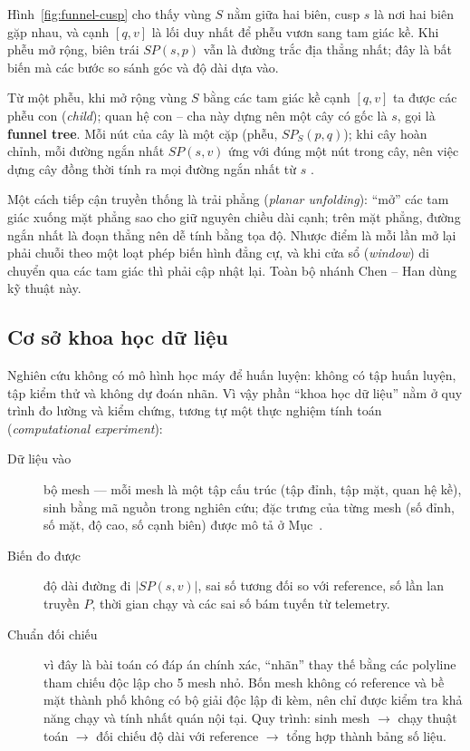 Hình~\ref{fig:funnel-cusp} cho thấy vùng $S$ nằm giữa hai biên, cusp $s$ là nơi
hai biên gặp nhau, và cạnh $[q,v]$ là lối duy nhất để phễu vươn sang tam giác kề.
Khi phễu mở rộng, biên trái $SP(s,p)$ vẫn là đường trắc địa thẳng nhất; đây là
bất biến mà các bước so sánh góc và độ dài dựa vào.

Từ một phễu, khi mở rộng vùng $S$ bằng các tam giác kề cạnh $[q,v]$ ta được các
phễu con (\emph{child}); quan hệ con -- cha này dựng nên một cây có gốc là $s$,
gọi là \textbf{funnel tree}. Mỗi nút của cây là một cặp (phễu, $SP_S(p,q)$); khi
cây hoàn chỉnh, mỗi đường ngắn nhất $SP(s,v)$ ứng với đúng một nút trong cây, nên
việc dựng cây đồng thời tính ra mọi đường ngắn nhất từ $s$ \cite{an2024funnel}.

Một cách tiếp cận truyền thống là trải phẳng (\emph{planar unfolding}): ``mở'' các
tam giác xuống mặt phẳng sao cho giữ nguyên chiều dài cạnh; trên mặt phẳng, đường
ngắn nhất là đoạn thẳng nên dễ tính bằng tọa độ. Nhược điểm là mỗi lần mở lại phải
chuỗi theo một loạt phép biến hình đẳng cự, và khi cửa sổ (\emph{window}) di
chuyển qua các tam giác thì phải cập nhật lại. Toàn bộ nhánh Chen -- Han dùng kỹ
thuật này.

\subsection{Cơ sở khoa học dữ liệu}

Nghiên cứu không có mô hình học máy để huấn luyện: không có tập huấn luyện, tập
kiểm thử và không dự đoán nhãn. Vì vậy phần ``khoa học dữ liệu'' nằm ở quy trình
đo lường và kiểm chứng, tương tự một thực nghiệm tính toán (\emph{computational
experiment}):
\begin{description}
  \item[Dữ liệu vào] bộ mesh --- mỗi mesh là một tập cấu trúc (tập đỉnh, tập mặt,
    quan hệ kề), sinh bằng mã nguồn trong nghiên cứu; đặc trưng của từng mesh (số
    đỉnh, số mặt, độ cao, số cạnh biên) được mô tả ở Mục~.
  \item[Biến đo được] độ dài đường đi $|SP(s,v)|$, sai số tương đối so với
    reference, số lần lan truyền $P$, thời gian chạy và các sai số bám tuyến từ
    telemetry.
  \item[Chuẩn đối chiếu] vì đây là bài toán có đáp án chính xác, ``nhãn'' thay thế
    bằng các polyline tham chiếu độc lập cho 5 mesh nhỏ. Bốn mesh không có
    reference và bề mặt thành phố không có bộ giải độc lập đi kèm, nên chỉ được
    kiểm tra khả năng chạy và tính nhất quán nội tại.
    Quy trình: sinh mesh $\to$ chạy thuật toán $\to$ đối chiếu độ dài với reference
    $\to$ tổng hợp thành bảng số liệu.
\end{description}

